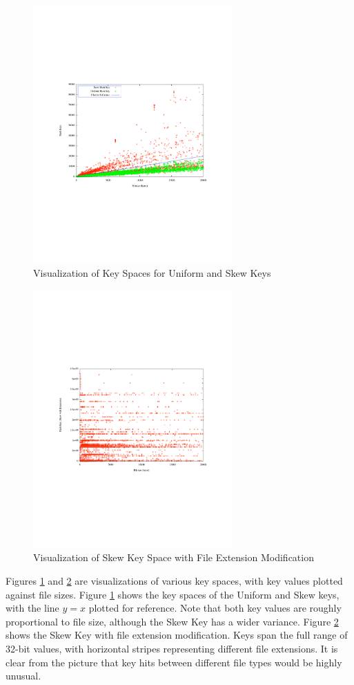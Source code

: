 \documentclass[10pt, twocolumn]{article}
\begin{document}
 \begin{figure}[h] 
 \centering
\includegraphics[width= 3in]{scatter_circles.pdf}
\caption{Visualization of Key Spaces for Uniform and Skew Keys}
\label{scatterPoster} 
\end{figure}   

 \begin{figure}[h] 
 \centering
\includegraphics[width= 3in]{skewExtScatter.pdf}
\caption{Visualization of  Skew Key Space with File Extension Modification}
\label{scatterExtension} 
\end{figure}   

Figures \ref{scatterPoster} and \ref{scatterExtension} are visualizations of various key spaces, with key values plotted against file sizes.  Figure \ref{scatterPoster} shows the key spaces of the Uniform and Skew keys, with the line $y=x$ plotted for reference.  Note that both key values are roughly proportional to file size, although the Skew Key has a wider variance.  Figure \ref{scatterExtension} shows the Skew Key with file extension modification.  Keys span the full range of 32-bit values, with horizontal stripes representing different file extensions.  It is clear from the picture that key hits between different file types would be highly unusual.
\end{document}
